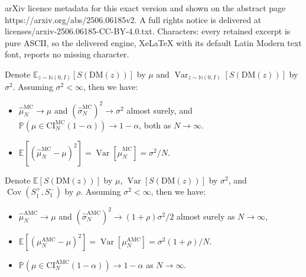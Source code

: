 \documentclass[10pt,a4paper]{amsart}
\DeclareMathOperator{\Cov}{Cov}
\DeclareMathOperator{\Var}{Var}
\newcommand{\AMC}{\text{AMC}}
\newcommand{\CI}{\text{CI}}
\newcommand{\DM}{\text{DM}}
\newcommand{\MC}{\text{MC}}
\newcommand{\bE}{\mathbb{E}}
\newcommand{\bN}{\mathbb{N}}
\newcommand{\bP}{\mathbb{P}}
\begin{document}
arXiv licence metadata for this exact version and shown on the abstract page https://arxiv.org/abs/2506.06185v2. A full rights notice is delivered at licenses/arxiv-2506.06185-CC-BY-4.0.txt. Characters: every retained excerpt is pure ASCII, so the delivered engine, XeLaTeX with its default Latin Modern text font, reports no missing character.
\begin{prop}\label{prop:MC-guarantee}
    Denote $\bE_{z\sim\bN(0,I)}[S(\DM(z))]$ by $\mu$ and $\Var_{z\sim\bN(0,I)}[S(\DM(z))]$ by $\sigma^2$. Assuming $\sigma^2 < \infty$, then we have:
    \begin{itemize}[leftmargin = *]
        \item $\hat \mu_N^\MC \rightarrow \mu$ and $(\hat\sigma_N^\MC)^2 \rightarrow \sigma^2$ almost surely, and   $\bP\left(\mu \in \CI^\MC_N(1-\alpha)\right) \rightarrow 1-\alpha$, both as $N\rightarrow \infty$.
        \item $\bE[(\hat\mu_N^\MC - \mu)^2] = \Var[\hat\mu_N^\MC] = \sigma^2/N$.
      
    \end{itemize}
\end{prop}

\begin{prop}\label{prop:AMC-guarantee}
    Denote $\bE[S(\DM(z))]$ by $\mu$, $\Var[S(\DM(z))]$ by $\sigma^2$, and $\Cov(S_1^+, S_1^-)$ by $\rho$. Assuming $\sigma^2 < \infty$, then we have:
    \begin{itemize}
        \item $\hat \mu_N^\AMC \rightarrow \mu$ and $(\hat\sigma_N^\AMC)^2 \rightarrow (1+\rho)\sigma^2/2$ almost surely as $N \rightarrow \infty$, 
        \item $\bE[(\mu_N^\AMC - \mu)^2] = \Var[\mu_N^\AMC] = \sigma^2(1+\rho)/N$. 
        \item $\bP\left(\mu \in \CI^\AMC_N(1-\alpha)\right) \rightarrow 1-\alpha$ as $N\rightarrow \infty$.
    \end{itemize}
\end{prop}
\end{document}
